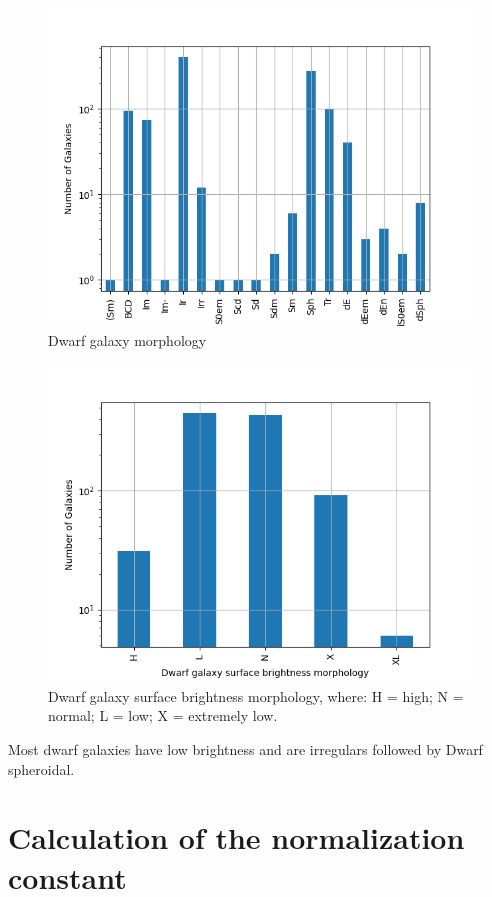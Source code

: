 \documentclass[a4paper]{article}
\begin{document}
\begin{figure}[htbp]
\centering
\includegraphics[width=.9\linewidth]{./graphs/hist-Tdw1.png}
\caption{\label{Types of dwarf galaxies}Dwarf galaxy morphology}
\end{figure}

\begin{figure}[htbp]
\centering
\includegraphics[width=.9\linewidth]{./graphs/hist-Tdw2.png}
\caption{\label{Types of dwarf galaxies brightness}Dwarf galaxy surface brightness morphology, where: H = high; N = normal; L = low; X = extremely low.}
\end{figure}

Most dwarf galaxies have low brightness and are irregulars followed by Dwarf spheroidal.

\section{Calculation of the normalization constant}
\label{sec:orgbe376f2}
\end{document}
